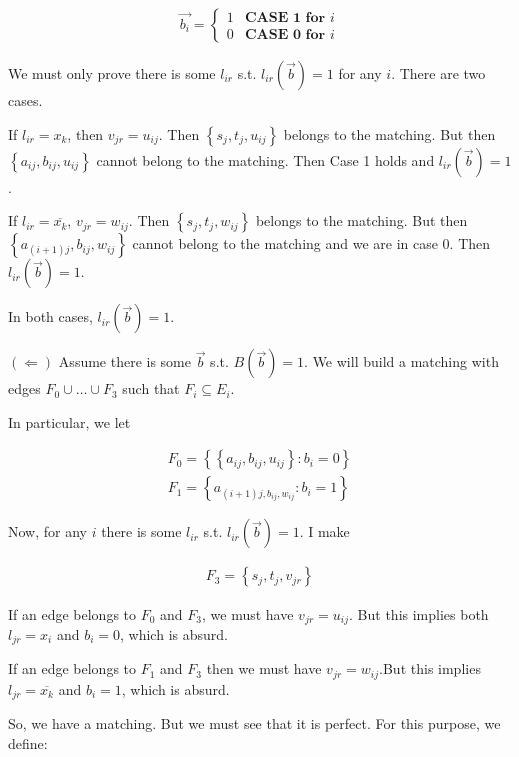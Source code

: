 \documentclass[a4paper, 12pt]{article}
\begin{document}
\begin{align*}
    \overrightarrow{b_i} = \begin{cases}
        1 & \textbf{CASE 1 for }i\\
        0 & \textbf{CASE 0 for }i
    \end{cases}
\end{align*}

We must only prove there is some $l_{ir}$ s.t. $l_{ir}(\overrightarrow{b}) = 1$ 
for any $i$. There are two cases. 

If $l_{ir} = x_k$, then $v_{jr} = u_{ij}$. Then $\left\{ s_j, t_j, u_{ij} \right\} $ 
belongs to the matching. But then $\left\{ a_{ij}, b_{ij}, u_{ij} \right\} $
cannot belong to the matching. Then Case 1 holds 
and $l_{ir}(\overrightarrow{b}) = 1$.

If $l_{ir} = \overline{x_k}$, $v_{jr} = w_{ij}$. Then 
$\left\{ s_j, t_j, w_{ij} \right\} $ belongs to the matching. 
But then $\left\{ a_{(i+1) j}, b_{ij}, w_{ij} \right\} $
cannot belong to the matching and we are in case 0.
Then $l_{ir}(\overrightarrow{b}) = 1$.

In both cases, $l_{ir}(\overrightarrow{b}) = 1$.


$(\Leftarrow)$ Assume there is some $\overrightarrow{b}$ s.t. $B(\overrightarrow{b}) = 1$.
We will build a matching with edges $F_0 \cup \ldots\cup F_3$ such that 
$F_i \subseteq E_i$.

In particular, we let 

\begin{align*}
    F_0 = \left\{ \left\{ a_{ij}, b_{ij}, u_{ij} \right\} : b_i = 0  \right\} \\ 
    F_1 = \left\{ a_{(i+1)j, b_{ij}, w_{ij}} : b_i = 1 \right\} 
\end{align*}

Now, for any $i$ there is some $l_{ir}$ s.t. $l_{ir}(\overrightarrow{b}) = 1$.
I make 

\begin{align*}
    F_3 = \left\{ s_j, t_j, v_{jr} \right\} 
\end{align*}

If an edge belongs to $F_0$ and $F_3$, we must have $v_{jr} = u_{ij}$. But this
implies both $l_{jr} = x_i$ and $b_i = 0$, which is absurd. 

If an edge belongs to $F_1$ and $F_3$ then we must have 
$v_{jr} = w_{ij}$.But this implies $l_{jr} = \overline{x_k}$ and 
$b_i = 1$, which is absurd. 

So, we have a matching. But we must see that it is perfect.
For this purpose, we define: 
\end{document}
